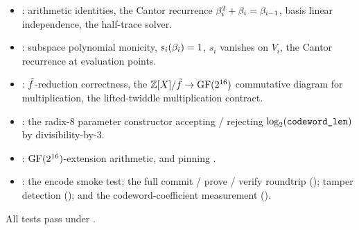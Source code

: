 \begin{itemize}
  \item {}:  arithmetic
    identities, the Cantor recurrence $\beta_i^2 + \beta_i = \beta_{i-1}$,
    basis linear independence, the half-trace solver.
  \item {}: subspace polynomial monicity,
    $s_i(\beta_i) = 1$, $s_i$ vanishes on $V_i$, the Cantor recurrence
    at evaluation points.
  \item {}: $\tilde f$-reduction correctness,
    the $\mathbb{Z}[X]/\tilde f \to \operatorname{GF}(2^{16})$ commutative diagram for
    multiplication, the lifted-twiddle multiplication contract.
  \item {}: the radix-8 parameter constructor
    accepting / rejecting $\log_2(\texttt{codeword\_len})$ by
    divisibility-by-$3$.
  \item {}: $\operatorname{GF}(2^{16})$-extension
    arithmetic, and 
    pinning .
  \item {}: the 
    encode smoke test; the full commit / prove / verify roundtrip
    (); tamper
    detection (); and the
    codeword-coefficient measurement ().
\end{itemize}

All tests pass under .
